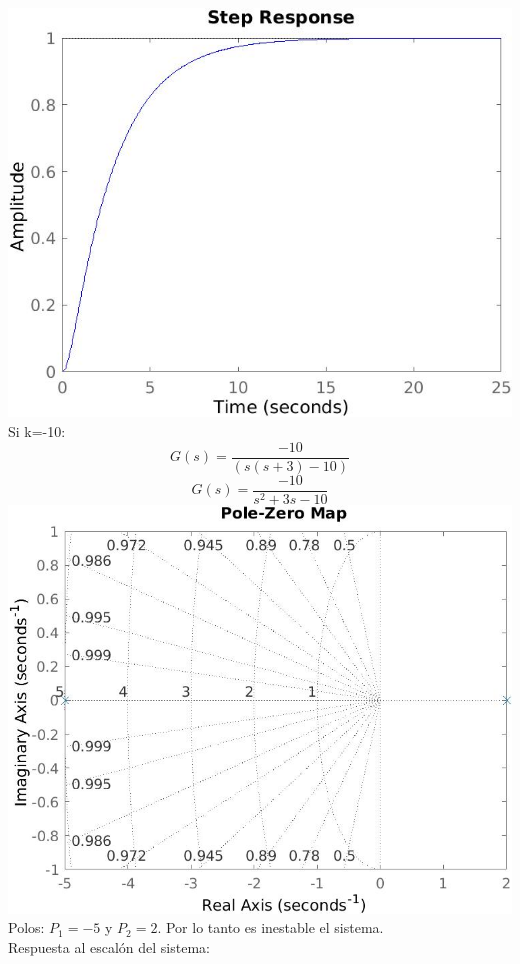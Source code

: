 \includegraphics[scale=0.4]{./img2/G5.jpg}\\
Si k=-10:
$$G(s)=\frac{-10}{(s(s+3)-10)}$$	
$$G(s)=\frac{-10}{s^{2}+3s-10}$$
\includegraphics[scale=0.36]{./img2/G4.jpg}\\ 	
Polos: $P_{1}=-5$ y $P_{2}=2$. Por lo tanto es inestable el sistema.\\
Respuesta al escalón del sistema:\\
